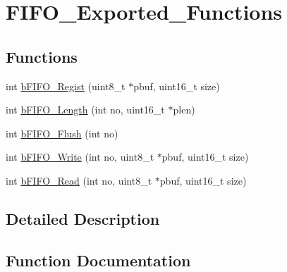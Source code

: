 \hypertarget{group___f_i_f_o___exported___functions}{}\section{F\+I\+F\+O\+\_\+\+Exported\+\_\+\+Functions}
\label{group___f_i_f_o___exported___functions}
\subsection*{Functions}
\begin{DoxyCompactItemize}
\item 
int \mbox{\hyperlink{group___f_i_f_o___exported___functions_ga8b9d241884018d7286093f4759053159}{b\+F\+I\+F\+O\+\_\+\+Regist}} (uint8\+\_\+t $\ast$pbuf, uint16\+\_\+t size)
\item 
int \mbox{\hyperlink{group___f_i_f_o___exported___functions_ga41d34a28dbae41e482bcbf241caeb899}{b\+F\+I\+F\+O\+\_\+\+Length}} (int no, uint16\+\_\+t $\ast$plen)
\item 
int \mbox{\hyperlink{group___f_i_f_o___exported___functions_ga1b974cf2c725e31b89d58d6da21f6089}{b\+F\+I\+F\+O\+\_\+\+Flush}} (int no)
\item 
int \mbox{\hyperlink{group___f_i_f_o___exported___functions_ga4aac823c61f21ceac467618edb17b27b}{b\+F\+I\+F\+O\+\_\+\+Write}} (int no, uint8\+\_\+t $\ast$pbuf, uint16\+\_\+t size)
\item 
int \mbox{\hyperlink{group___f_i_f_o___exported___functions_ga5cb3e1921484b7ecaed70dc77e30c26e}{b\+F\+I\+F\+O\+\_\+\+Read}} (int no, uint8\+\_\+t $\ast$pbuf, uint16\+\_\+t size)
\end{DoxyCompactItemize}


\subsection{Detailed Description}


\subsection{Function Documentation}
\mbox{\label{group___f_i_f_o___exported___functions_ga1b974cf2c725e31b89d58d6da21f6089}} 
